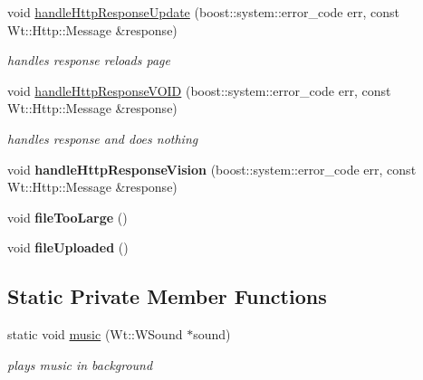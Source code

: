 \begin{DoxyCompactItemize}
void \hyperlink{classSingleGroupsControlWidget_a5049556fc39b63323ab534ba65e398e3}{handle\+Http\+Response\+Update} (boost\+::system\+::error\+\_\+code err, const Wt\+::\+Http\+::\+Message \&response)
\begin{DoxyCompactList}\small\item\em handles response reloads page \end{DoxyCompactList}\item 
void \hyperlink{classSingleGroupsControlWidget_a8f1e4dc31eb242ce4284a1bad9d2fbcb}{handle\+Http\+Response\+V\+O\+ID} (boost\+::system\+::error\+\_\+code err, const Wt\+::\+Http\+::\+Message \&response)
\begin{DoxyCompactList}\small\item\em handles response and does nothing \end{DoxyCompactList}\item 
void {\bfseries handle\+Http\+Response\+Vision} (boost\+::system\+::error\+\_\+code err, const Wt\+::\+Http\+::\+Message \&response)\hypertarget{classSingleGroupsControlWidget_a5e804906ddde71791b126a0ed2d3c8b1}{}\label{classSingleGroupsControlWidget_a5e804906ddde71791b126a0ed2d3c8b1}

\item 
void {\bfseries file\+Too\+Large} ()\hypertarget{classSingleGroupsControlWidget_abcf203e1a093ecb8ba2672505c82368a}{}\label{classSingleGroupsControlWidget_abcf203e1a093ecb8ba2672505c82368a}

\item 
void {\bfseries file\+Uploaded} ()\hypertarget{classSingleGroupsControlWidget_a9616e1e8a91942116069b03d4ec9c5e7}{}\label{classSingleGroupsControlWidget_a9616e1e8a91942116069b03d4ec9c5e7}

\end{DoxyCompactItemize}
\subsection*{Static Private Member Functions}
\begin{DoxyCompactItemize}
\item 
static void \hyperlink{classSingleGroupsControlWidget_adba20587e7d7afd7e7ef5d95b242579e}{music} (Wt\+::\+W\+Sound $\ast$sound)
\begin{DoxyCompactList}\small\item\em plays music in background \end{DoxyCompactList}\end{DoxyCompactItemize}
